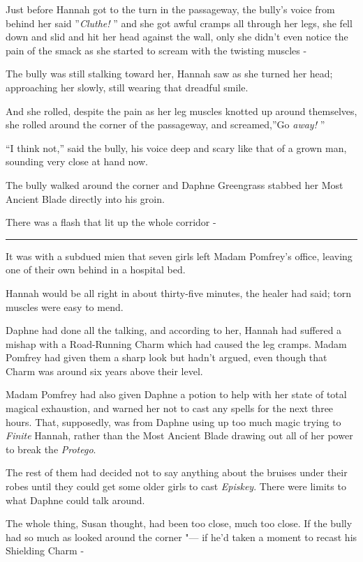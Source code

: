Just before Hannah got to the turn in the passageway, the bully's voice
from behind her said ''\emph{Cluthe!} '' and she got awful cramps all
through her legs, she fell down and slid and hit her head against the
wall, only she didn't even notice the pain of the smack as she started
to scream with the twisting muscles -

The bully was still stalking toward her, Hannah saw as she turned her
head; approaching her slowly, still wearing that dreadful smile.

And she rolled, despite the pain as her leg muscles knotted up around
themselves, she rolled around the corner of the passageway, and
screamed,''Go \emph{away!} ''

``I think not,'' said the bully, his voice deep and scary like that of a
grown man, sounding very close at hand now.

The bully walked around the corner and Daphne Greengrass stabbed her
Most Ancient Blade directly into his groin.

There was a flash that lit up the whole corridor -

\begin{center}\rule{3in}{0.4pt}\end{center}

It was with a subdued mien that seven girls left Madam Pomfrey's office,
leaving one of their own behind in a hospital bed.

Hannah would be all right in about thirty-five minutes, the healer had
said; torn muscles were easy to mend.

Daphne had done all the talking, and according to her, Hannah had
suffered a mishap with a Road-Running Charm which had caused the leg
cramps. Madam Pomfrey had given them a sharp look but hadn't argued,
even though that Charm was around six years above their level.

Madam Pomfrey had also given Daphne a potion to help with her state of
total magical exhaustion, and warned her not to cast any spells for the
next three hours. That, supposedly, was from Daphne using up too much
magic trying to \emph{Finite} Hannah, rather than the Most Ancient Blade
drawing out all of her power to break the \emph{Protego}.

The rest of them had decided not to say anything about the bruises under
their robes until they could get some older girls to cast
\emph{Episkey}. There were limits to what Daphne could talk around.

The whole thing, Susan thought, had been too close, much too close. If
the bully had so much as looked around the corner "--- if he'd taken a
moment to recast his Shielding Charm -

